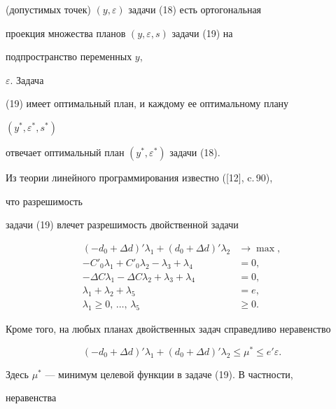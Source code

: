 (допустимых точек) $(y,\varepsilon)$ задачи (18) есть ортогональная 


проекция множества планов $(y,\varepsilon,s)$ задачи (19) на 


подпространство переменных $y$, 


$\varepsilon$. Задача 


(19) имеет оптимальный план, и каждому ее оптимальному плану 


$(y^*,\varepsilon^*,s^*)$ 


отвечает оптимальный план $(y^*,\varepsilon^*)$ задачи (18). 


 


Из теории линейного программирования известно ([12], c.\,90), 


что разрешимость 


задачи (19) влечет разрешимость двойственной задачи 


\begin{equation} 


\begin{split} 


(-d_0+\Delta d)'\lambda_1+(d_0+\Delta d)'\lambda_2&\to\max,\\ 


-C'_0\lambda_1+C'_0\lambda_2-\lambda_3+\lambda_4&=0,\\ 


-\Delta C \lambda_1-\Delta C \lambda_2+\lambda_3+\lambda_4&=0,\\ 


\lambda_1+\lambda_2+\lambda_5&=e,\\ 


\lambda_1\ge 0,\,\dotsc,\,\lambda_5&\ge 0. 


\end{split} 


\end{equation} 


Кроме того, на любых планах двойственных задач справедливо неравенство 


\begin{equation} 


(-d_0+\Delta d)'\lambda_1+(d_0+\Delta d)'\lambda_2\le 


\mu^*\le e'\varepsilon. 


\end{equation} 


Здесь $\mu^*$ --- минимум целевой функции в задаче (19). В частности, 


неравенства 



